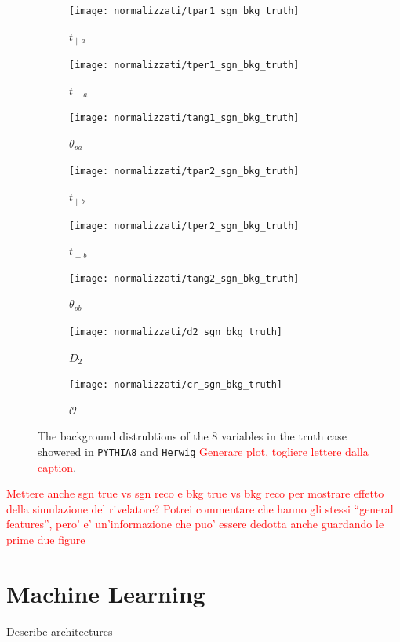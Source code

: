 \documentclass[10pt,a4paper]{book}
\newcommand\todo[1]{\textcolor{red}{#1}}
\def\code#1{\texttt{#1}}
\begin{document}
\begin{figure}
\begin{subfigure}{.33\textwidth}
\centering
\texttt{[image: normalizzati/tpar1\_sgn\_bkg\_truth]}
\caption{$t_{\parallel a}$}
\end{subfigure}
\begin{subfigure}{0.33\textwidth}
\centering
\texttt{[image: normalizzati/tper1\_sgn\_bkg\_truth]}
\caption{$t_{\perp a}$}
\end{subfigure}
\begin{subfigure}{.33\textwidth}
\centering
\texttt{[image: normalizzati/tang1\_sgn\_bkg\_truth]}
\caption{$\theta_{pa}$}
\end{subfigure}
\begin{subfigure}{.33\textwidth}
\centering
\texttt{[image: normalizzati/tpar2\_sgn\_bkg\_truth]}
\caption{$t_{\parallel b}$}
\end{subfigure}
\begin{subfigure}{0.33\textwidth}
\centering
\texttt{[image: normalizzati/tper2\_sgn\_bkg\_truth]}
\caption{$t_{\perp b}$}
\end{subfigure}
\begin{subfigure}{.33\textwidth}
\centering
\texttt{[image: normalizzati/tang2\_sgn\_bkg\_truth]}
\caption{$\theta_{pb}$}
\end{subfigure}
\begin{subfigure}{0.5\textwidth}
\centering
\texttt{[image: normalizzati/d2\_sgn\_bkg\_truth]}
\caption{$D_2$}
\end{subfigure}
\begin{subfigure}{.5\textwidth}
\centering
\texttt{[image: normalizzati/cr\_sgn\_bkg\_truth]}
\caption{$\mathcal{O}$}
\end{subfigure}
\caption{The background distrubtions of the 8 variables in the truth case showered in \code{PYTHIA8} and \code{Herwig} \todo{Generare plot, togliere lettere dalla caption}.}
\label{pythia herwig bkg}
\end{figure}

\todo{Mettere anche sgn true vs sgn reco e bkg true vs bkg reco per mostrare effetto della simulazione del rivelatore? Potrei commentare che hanno gli stessi ``general features'', pero' e' un'informazione che puo' essere dedotta anche guardando le prime due figure}


\section{Machine Learning}
Describe architectures
\end{document}
